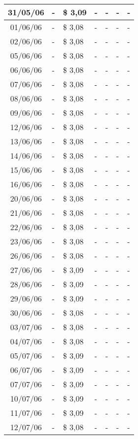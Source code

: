 \begin{center}
\begin{longtable}{|c|p{1.5cm}|p{1.5cm}|p{1.5cm}|p{1.5cm}|p{1.5cm}|p{1.5cm}|}
31/05/06 & - & \$ 3,09 & - & - & - & - \\ \hline
01/06/06 & - & \$ 3,08 & - & - & - & - \\ \hline
02/06/06 & - & \$ 3,08 & - & - & - & - \\ \hline
05/06/06 & - & \$ 3,08 & - & - & - & - \\ \hline
06/06/06 & - & \$ 3,08 & - & - & - & - \\ \hline
07/06/06 & - & \$ 3,08 & - & - & - & - \\ \hline
08/06/06 & - & \$ 3,08 & - & - & - & - \\ \hline
09/06/06 & - & \$ 3,08 & - & - & - & - \\ \hline
12/06/06 & - & \$ 3,08 & - & - & - & - \\ \hline
13/06/06 & - & \$ 3,08 & - & - & - & - \\ \hline
14/06/06 & - & \$ 3,08 & - & - & - & - \\ \hline
15/06/06 & - & \$ 3,08 & - & - & - & - \\ \hline
16/06/06 & - & \$ 3,08 & - & - & - & - \\ \hline
20/06/06 & - & \$ 3,08 & - & - & - & - \\ \hline
21/06/06 & - & \$ 3,08 & - & - & - & - \\ \hline
22/06/06 & - & \$ 3,08 & - & - & - & - \\ \hline
23/06/06 & - & \$ 3,08 & - & - & - & - \\ \hline
26/06/06 & - & \$ 3,08 & - & - & - & - \\ \hline
27/06/06 & - & \$ 3,09 & - & - & - & - \\ \hline
28/06/06 & - & \$ 3,09 & - & - & - & - \\ \hline
29/06/06 & - & \$ 3,09 & - & - & - & - \\ \hline
30/06/06 & - & \$ 3,08 & - & - & - & - \\ \hline
03/07/06 & - & \$ 3,08 & - & - & - & - \\ \hline
04/07/06 & - & \$ 3,08 & - & - & - & - \\ \hline
05/07/06 & - & \$ 3,09 & - & - & - & - \\ \hline
06/07/06 & - & \$ 3,09 & - & - & - & - \\ \hline
07/07/06 & - & \$ 3,09 & - & - & - & - \\ \hline
10/07/06 & - & \$ 3,09 & - & - & - & - \\ \hline
11/07/06 & - & \$ 3,09 & - & - & - & - \\ \hline
12/07/06 & - & \$ 3,08 & - & - & - & - \\ \hline

\end{longtable}
\end{center}
